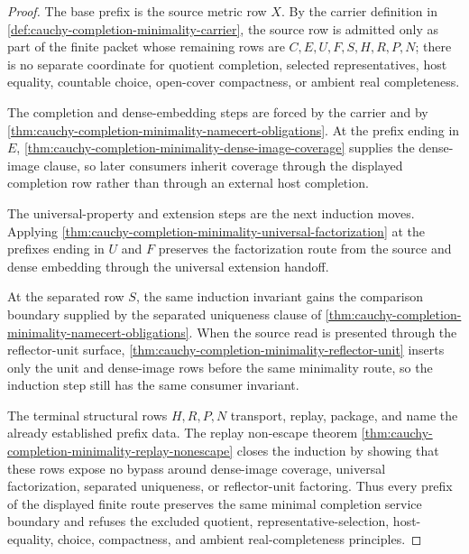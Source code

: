 \begin{proof}
The base prefix is the source metric row $X$. By the carrier definition in \autoref{def:cauchy-completion-minimality-carrier}, the source row is admitted only as part of the finite packet whose remaining rows are $C,E,U,F,S,H,R,P,N$; there is no separate coordinate for quotient completion, selected representatives, host equality, countable choice, open-cover compactness, or ambient real completeness.

The completion and dense-embedding steps are forced by the carrier and by \autoref{thm:cauchy-completion-minimality-namecert-obligations}. At the prefix ending in $E$, \autoref{thm:cauchy-completion-minimality-dense-image-coverage} supplies the dense-image clause, so later consumers inherit coverage through the displayed completion row rather than through an external host completion.

The universal-property and extension steps are the next induction moves. Applying \autoref{thm:cauchy-completion-minimality-universal-factorization} at the prefixes ending in $U$ and $F$ preserves the factorization route from the source and dense embedding through the universal extension handoff.

At the separated row $S$, the same induction invariant gains the comparison boundary supplied by the separated uniqueness clause of \autoref{thm:cauchy-completion-minimality-namecert-obligations}. When the source read is presented through the reflector-unit surface, \autoref{thm:cauchy-completion-minimality-reflector-unit} inserts only the unit and dense-image rows before the same minimality route, so the induction step still has the same consumer invariant.

The terminal structural rows $H,R,P,N$ transport, replay, package, and name the already established prefix data. The replay non-escape theorem \autoref{thm:cauchy-completion-minimality-replay-nonescape} closes the induction by showing that these rows expose no bypass around dense-image coverage, universal factorization, separated uniqueness, or reflector-unit factoring. Thus every prefix of the displayed finite route preserves the same minimal completion service boundary and refuses the excluded quotient, representative-selection, host-equality, choice, compactness, and ambient real-completeness principles.
\end{proof}

